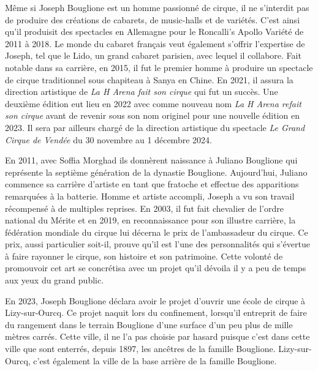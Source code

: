 Même si Joseph Bouglione est un homme passionné de cirque, il ne s’interdit pas de produire des créations de cabarets, de music-halls et de variétés. C’est ainsi qu’il produisit des spectacles en Allemagne pour le Roncalli’s Apollo Variété de 2011 à 2018. Le monde du cabaret français veut également s’offrir l’expertise de Joseph, tel que le Lido, un grand cabaret parisien, avec lequel il collabore. Fait notable dans sa carrière, en 2015, il fut le premier homme à produire un spectacle de cirque traditionnel sous chapiteau à Sanya en Chine. En 2021, il assura la direction artistique de \textit{La H Arena fait son cirque} qui fut un succès. Une deuxième édition eut lieu en 2022 avec comme nouveau nom \textit{La H Arena refait son cirque} avant de revenir sous son nom originel pour une nouvelle édition en 2023. Il sera par ailleurs chargé de la direction artistique du spectacle \textit{Le Grand Cirque de Vendée} du 30 novembre au 1 décembre 2024.

En 2011, avec Soffia Morghad ils donnèrent naissance à Juliano Bouglione qui représente la septième génération de la dynastie Bouglione. Aujourd’hui, Juliano commence sa carrière d’artiste en tant que fratoche et effectue des apparitions remarquées à la batterie. Homme et artiste accompli, Joseph a vu son travail récompensé à de multiples reprises. En 2003, il fut fait chevalier de l’ordre national du Mérite et en 2019, en reconnaissance pour son illustre carrière, la fédération mondiale du cirque lui décerna le prix de l’ambassadeur du cirque. Ce prix, aussi particulier soit-il, prouve qu'il est l’une des personnalités qui s’évertue à faire rayonner le cirque, son histoire et son patrimoine. Cette volonté de promouvoir cet art se concrétisa avec un projet qu’il dévoila il y a peu de temps aux yeux du grand public.

En 2023, Joseph Bouglione déclara avoir le projet d'ouvrir une école de cirque à Lizy-sur-Ourcq. Ce projet naquit lors du confinement, lorsqu’il entreprit de faire du rangement dans le terrain Bouglione d’une surface d’un peu plus de mille mètres carrés. Cette ville, il ne l’a pas choisie par hasard puisque c’est dans cette ville que sont enterrés, depuis 1897, les ancêtres de la famille Bouglione. Lizy-sur-Ourcq, c’est également la ville de la base arrière de la famille Bouglione. 

